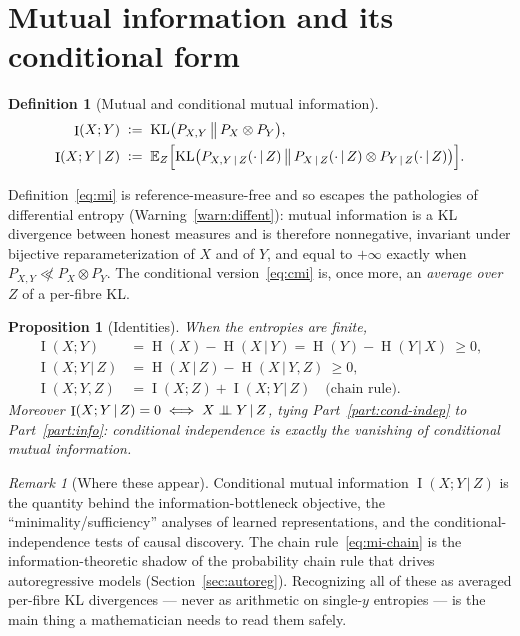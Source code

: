 \documentclass[11pt,oneside]{report}
\theoremstyle{plain}
\newtheorem{proposition}[theorem]{Proposition}
\theoremstyle{definition}
\newtheorem{definition}[theorem]{Definition}
\theoremstyle{remark}
\newtheorem{remark}[theorem]{Remark}
\newcommand{\E}{\mathbb{E}}
\newcommand{\defeq}{\vcentcolon=}
\newcommand{\given}{\,\vert\,}
\newcommand{\indep}{\mathrel{\perp\mkern-10mu\perp}}
\DeclareMathOperator{\KL}{KL}
\DeclareMathOperator{\Ent}{H}        %
\DeclareMathOperator{\MI}{I}         %
\numberwithin{equation}{chapter}
\begin{document}
\section{Mutual information and its conditional form}

\begin{definition}[Mutual and conditional mutual information]\label{def:mi}
\begin{align}
  \MI(X;Y)&\;\defeq\;\KL\bigl(P_{X,Y}\,\big\|\,P_X\otimes P_Y\bigr),\label{eq:mi}\\
  \MI(X;Y\given Z)&\;\defeq\;
    \E_Z\Bigl[\KL\bigl(P_{X,Y\given Z}(\cdot\given Z)\,\big\|\,
       P_{X\given Z}(\cdot\given Z)\otimes P_{Y\given Z}(\cdot\given Z)\bigr)\Bigr].
  \label{eq:cmi}
\end{align}
\end{definition}

Definition~\eqref{eq:mi} is reference-measure-free and so escapes the
pathologies of differential entropy (Warning~\ref{warn:diffent}): mutual
information is a KL divergence between honest measures and is therefore
nonnegative, invariant under bijective reparameterization of $X$ and of
$Y$, and equal to $+\infty$ exactly when $P_{X,Y}\not\ll P_X\otimes P_Y$.
The conditional version~\eqref{eq:cmi} is, once more, an \emph{average over
$Z$} of a per-fibre KL.

\begin{proposition}[Identities]\label{prop:mi-ids}
When the entropies are finite,
\begin{align}
  \MI(X;Y)&=\Ent(X)-\Ent(X\given Y)=\Ent(Y)-\Ent(Y\given X)\ \ge 0,\\
  \MI(X;Y\given Z)&=\Ent(X\given Z)-\Ent(X\given Y,Z)\ \ge 0,\\
  \MI(X;Y,Z)&=\MI(X;Z)+\MI(X;Y\given Z) \quad\text{(chain rule).}
  \label{eq:mi-chain}
\end{align}
Moreover $\MI(X;Y\given Z)=0\iff X\indep Y\given Z$, tying
Part~\ref{part:cond-indep} to Part~\ref{part:info}: \emph{conditional
independence is exactly the vanishing of conditional mutual information.}
\end{proposition}

\begin{remark}[Where these appear]
Conditional mutual information $\MI(X;Y\given Z)$ is the quantity behind the
information-bottleneck objective, the ``minimality/sufficiency'' analyses of
learned representations, and the conditional-independence tests of causal
discovery. The chain rule~\eqref{eq:mi-chain} is the information-theoretic
shadow of the probability chain rule that drives autoregressive models
(Section~\ref{sec:autoreg}). Recognizing all of these as averaged
per-fibre KL divergences --- never as arithmetic on single-$y$ entropies ---
is the main thing a mathematician needs to read them safely.
\end{remark}
\end{document}
